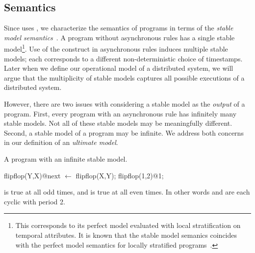 
\subsection{Semantics}
Since \lang uses , we characterize the semantics of \lang programs in terms of the {\em stable model semantics}~\cite{stable-model}.  A \lang program without asynchronous rules has a single stable model\footnote{This corresponds to its perfect model evaluated with local stratification on temporal attributes.  It is known that the stable model semanics coincides with the perfect model semantics for locally stratified programs~\cite{stable-model}.}.  Use of the  construct in asynchronous rules induces multiple stable models; each corresponds to a different non-deterministic choice of timestamps.  Later when we define our operational model of a distributed system, we will argue that the multiplicity of stable models captures all possible executions of a distributed system.

However, there are two issues with considering a stable model as the {\em output} of a \lang program.  First, every program with an asynchronous rule has infinitely many stable models.  Not all of these stable models may be meaningfully different.  Second, a stable model of a \lang program may be infinite.  We address both concerns in our definition of an {\em ultimate model}.

\begin{example}
\label{ex:flipflop}
A \lang program with an infinite stable model.

\begin{Dedalus}
flipflop(Y,X)@next \(\leftarrow\) flipflop(X,Y);
flipflop(1,2)@1;
\end{Dedalus}

 is true at all odd times, and  is true at all even times.  In other words  and  are each cyclic with period 2.
\end{example}


